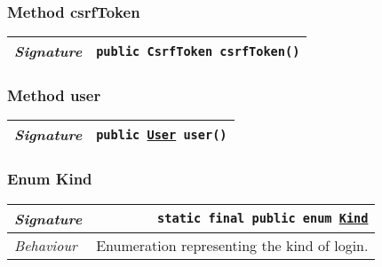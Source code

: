 \begin{adjustwidth}{1.5em}{0pt}
\begin{adjustwidth}{1.5em}{0pt}
\begin{adjustwidth}{1.5em}{0pt}
{\begin{tabularx}{1.0\linewidth}{@{}l R@{}}
      \end{tabularx}}
    \end{adjustwidth}\subsubsection{Method csrfToken\label{edu.kit.hci.soli.dto.LoginStateModel@csrfToken()}}
    \begin{adjustwidth}{1.5em}{0pt}
      {\begin{tabularx}{1.0\linewidth}{@{}l R@{}}
        \emph{Signature} & \texttt{public \texttt{CsrfToken} csrfToken()} \\
        \hline
  
      \end{tabularx}}
    \end{adjustwidth}\subsubsection{Method user\label{edu.kit.hci.soli.dto.LoginStateModel@user()}}
    \begin{adjustwidth}{1.5em}{0pt}
      {\begin{tabularx}{1.0\linewidth}{@{}l R@{}}
        \emph{Signature} & \texttt{public \texttt{\hyperref[edu.kit.hci.soli.domain.User]{\texttt{User}}} user()} \\
        \hline
  
      \end{tabularx}}
    \end{adjustwidth}\subsubsection{Enum Kind\label{edu.kit.hci.soli.dto.LoginStateModel.Kind} }
    \begin{adjustwidth}{1.5em}{0pt}
      {\begin{tabularx}{1.0\linewidth}{@{}l R@{}}
        \emph{Signature} & \texttt{static final public  enum \texttt{\hyperref[edu.kit.hci.soli.dto.LoginStateModel.Kind]{\texttt{Kind}}}} \\
        \hline
        \emph{Behaviour} & Enumeration representing the kind of login.  \\
        \hline
  
      \end{tabularx}}
    \end{adjustwidth}
  \end{adjustwidth}
\end{adjustwidth}